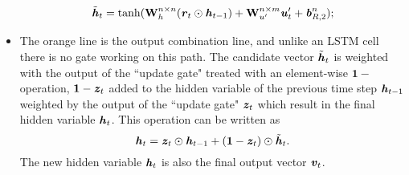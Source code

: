 \begin{itemize}
\begin{equation}
	\tilde{\textbf{\textit{h}}}_t = \tanh(\textbf{W}^{n\times n}_{h}(\textbf{\textit{r}}_t\odot \textbf{\textit{h}}_{t-1})+\textbf{W}^{n\times m}_{u'}\textbf{\textit{u}}'_{t}+\textbf{\textit{b}}^n_{R,2});
	\end{equation}
	\item The orange line is the output combination line, and unlike an LSTM cell there is no gate working on this path. The candidate vector $ \tilde{\textbf{\textit{h}}}_t $ is weighted with the output of the ``update gate" treated with an element-wise $ \boxed{\bm1-} $ operation, $ \bm1-\textbf{\textit{z}}_t $ added to the hidden variable of the previous time step $ \textbf{\textit{h}}_{t-1} $ weighted by the output of the ``update gate" $ \textbf{\textit{z}}_t $ which result in the final hidden variable $ \textbf{\textit{h}}_t $. This operation can be written as
	\begin{equation}\label{app-lstm-gru-4}
	\textbf{\textit{h}}_t = \textbf{\textit{z}}_t\odot\textbf{\textit{h}}_{t-1}+(\bm1-\textbf{\textit{z}}_t)\odot\tilde{\textbf{\textit{h}}}_t.
	\end{equation}
	The new hidden variable $ \textbf{\textit{h}}_t $ is also the final output vector $ \textbf{\textit{v}}_t $.
	
\end{itemize}

